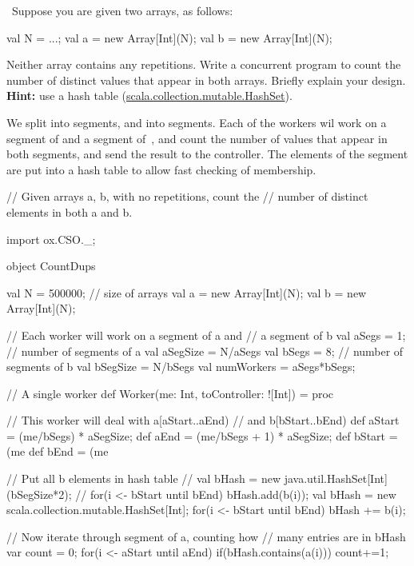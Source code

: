 \begin{question}
\Programming\
Suppose you are given two arrays, as follows:
%
\begin{scala}
  val N = ...;
  val a = new Array[Int](N);
  val b = new Array[Int](N);
\end{scala}
%
Neither array contains any repetitions.  Write a concurrent program to count
the number of distinct values that appear in both arrays.  Briefly explain
your design.  \textbf{Hint:} use a hash table
(\url{scala.collection.mutable.HashSet}).   
\end{question}


\begin{answer}
We split  into  segments, and  into
\SCALA{bSegs} segments.  Each of the  workers
wil work on a segment of \SCALA{a} and a segment of~, and count the
number of values that appear in both segments, and send the result to the
controller.  The elements of the \SCALA{b} segment are put into a hash table
to allow fast checking of membership.
%
\begin{scala}
// Given arrays a, b, with no repetitions, count the 
// number of distinct elements in both a and b.

import ox.CSO._;

object CountDups{
  val N = 500000; // size of arrays
  val a = new Array[Int](N);
  val b = new Array[Int](N);

  // Each worker will work on a segment of a and 
  // a segment of b
  val aSegs = 1; // number of segments of a
  val aSegSize = N/aSegs
  val bSegs = 8; // number of segments of b
  val bSegSize = N/bSegs
  val numWorkers = aSegs*bSegs; 

  // A single worker
  def Worker(me: Int, toController: ![Int]) = proc{
    // This worker will deal with a[aStart..aEnd) 
    // and b[bStart..bEnd) 
    def aStart = (me/bSegs) * aSegSize;
    def aEnd = (me/bSegs + 1) * aSegSize;
    def bStart = (me%
    def bEnd = (me%

    // Put all b elements in hash table
    // val bHash = new java.util.HashSet[Int](bSegSize*2);
    // for(i <- bStart until bEnd) bHash.add(b(i));
    val bHash = new scala.collection.mutable.HashSet[Int];
    for(i <- bStart until bEnd) bHash += b(i);

    // Now iterate through segment of a, counting how 
    // many entries are in bHash
    var count = 0;
    for(i <- aStart until aEnd)
      if(bHash.contains(a(i))) count+=1;

}}
\end{scala}
\end{answer}

